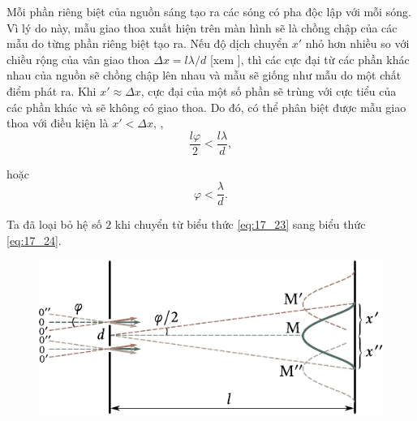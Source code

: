 Mỗi phần riêng biệt của nguồn sáng tạo ra các sóng có pha độc lập với mỗi sóng.
Vì lý do này, mẫu giao thoa xuất hiện trên màn hình sẽ là chồng chập của các mẫu do từng phần riêng biệt tạo ra.
Nếu độ dịch chuyển $x'$ nhỏ hơn nhiều so với chiều rộng của vân giao thoa $\Delta{x}=l\lambda/d$ [xem ], thì các cực đại từ các phần khác nhau của nguồn sẽ chồng chập lên nhau và mẫu sẽ giống như mẫu do một chất điểm phát ra.
Khi $x'\approx\Delta{x}$, cực đại của một số phần sẽ trùng với cực tiểu của các phần khác và sẽ không có giao thoa.
Do đó, có thể phân biệt được mẫu giao thoa với điều kiện là $x'<\Delta{x}$, \ie,
\begin{equation}\label{eq:17_23}
    \frac{l \varphi}{2} < \frac{l \lambda}{d},
\end{equation}

\noindent
hoặc
\begin{equation}\label{eq:17_24}
    \varphi < \frac{\lambda}{d}.
\end{equation}

\noindent
Ta đã loại bỏ hệ số $2$ khi chuyển từ biểu thức \eqref{eq:17_23} sang biểu thức \eqref{eq:17_24}.

\begin{figure}[!htb]
	\begin{center}
		\includegraphics[scale=1]{figures/ch_17/fig_17_7.pdf}
		\caption[]{}
		\label{fig:17_7}
	\end{center}
	\vspace{-0.9cm}
\end{figure}


